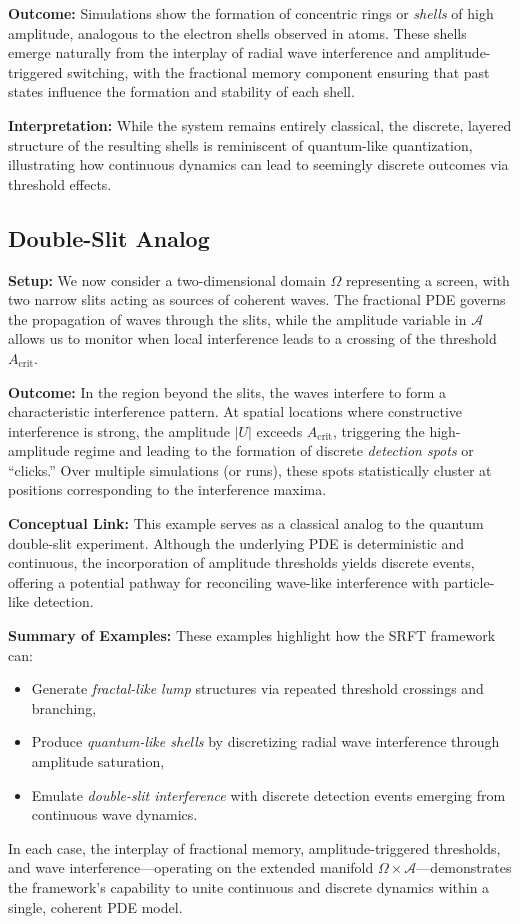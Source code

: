 \documentclass[12pt]{article}
\begin{document}
\textbf{Outcome:}  
Simulations show the formation of concentric rings or \emph{shells} of high amplitude, analogous to the electron shells observed in atoms. These shells emerge naturally from the interplay of radial wave interference and amplitude-triggered switching, with the fractional memory component ensuring that past states influence the formation and stability of each shell.

\textbf{Interpretation:}  
While the system remains entirely classical, the discrete, layered structure of the resulting shells is reminiscent of quantum-like quantization, illustrating how continuous dynamics can lead to seemingly discrete outcomes via threshold effects.

\medskip

\subsection{Double-Slit Analog}
\label{subsec:double_slit_analog}

\textbf{Setup:}  
We now consider a two-dimensional domain $\Omega$ representing a screen, with two narrow slits acting as sources of coherent waves. The fractional PDE governs the propagation of waves through the slits, while the amplitude variable in $\mathcal{A}$ allows us to monitor when local interference leads to a crossing of the threshold $A_{\mathrm{crit}}$.

\textbf{Outcome:}  
In the region beyond the slits, the waves interfere to form a characteristic interference pattern. At spatial locations where constructive interference is strong, the amplitude $|U|$ exceeds $A_{\mathrm{crit}}$, triggering the high-amplitude regime and leading to the formation of discrete \emph{detection spots} or “clicks.” Over multiple simulations (or runs), these spots statistically cluster at positions corresponding to the interference maxima.

\textbf{Conceptual Link:}  
This example serves as a classical analog to the quantum double-slit experiment. Although the underlying PDE is deterministic and continuous, the incorporation of amplitude thresholds yields discrete events, offering a potential pathway for reconciling wave-like interference with particle-like detection.

\medskip

\noindent
\textbf{Summary of Examples:}  
These examples highlight how the SRFT framework can:
\begin{itemize}
    \item Generate \emph{fractal-like lump} structures via repeated threshold crossings and branching,
    \item Produce \emph{quantum-like shells} by discretizing radial wave interference through amplitude saturation,
    \item Emulate \emph{double-slit interference} with discrete detection events emerging from continuous wave dynamics.
\end{itemize}
In each case, the interplay of fractional memory, amplitude-triggered thresholds, and wave interference—operating on the extended manifold $\Omega \times \mathcal{A}$—demonstrates the framework’s capability to unite continuous and discrete dynamics within a single, coherent PDE model.
\end{document}
